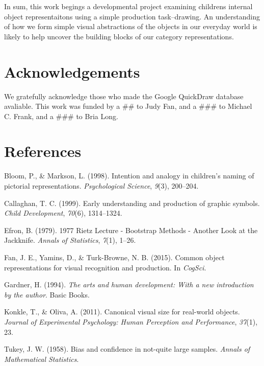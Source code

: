 \documentclass[10pt, letterpaper]{article}
\begin{document}
In sum, this work begings a developmental project examining childrens
internal object representaitons using a simple production task--drawing.
An understanding of how we form simple visual abstractions of the
objects in our everyday world is likely to help uncover the building
blocks of our category representations.

\section{Acknowledgements}\label{acknowledgements}

We gratefully acknowledge those who made the Google QuickDraw database
avaliable. This work was funded by a \#\# to Judy Fan, and a \#\#\# to
Michael C. Frank, and a \#\#\# to Bria Long.

\section{References}\label{references}

\setlength{\parindent}{-0.1in} \setlength{\leftskip}{0.125in} \noindent

\hypertarget{refs}{}
\hypertarget{ref-bloom1998intention}{}
Bloom, P., \& Markson, L. (1998). Intention and analogy in children's
naming of pictorial representations. \emph{Psychological Science},
\emph{9}(3), 200--204.

\hypertarget{ref-callaghan1999early}{}
Callaghan, T. C. (1999). Early understanding and production of graphic
symbols. \emph{Child Development}, \emph{70}(6), 1314--1324.

\hypertarget{ref-Efron:1979ts}{}
Efron, B. (1979). 1977 Rietz Lecture - Bootstrap Methods - Another Look
at the Jackknife. \emph{Annals of Statistics}, \emph{7}(1), 1--26.

\hypertarget{ref-fan2015common}{}
Fan, J. E., Yamins, D., \& Turk-Browne, N. B. (2015). Common object
representations for visual recognition and production. In \emph{CogSci}.

\hypertarget{ref-gardner1994arts}{}
Gardner, H. (1994). \emph{The arts and human development: With a new
introduction by the author}. Basic Books.

\hypertarget{ref-konkle2011canonical}{}
Konkle, T., \& Oliva, A. (2011). Canonical visual size for real-world
objects. \emph{Journal of Experimental Psychology: Human Perception and
Performance}, \emph{37}(1), 23.

\hypertarget{ref-Tukey:1958wn}{}
Tukey, J. W. (1958). Bias and confidence in not-quite large samples.
\emph{Annals of Mathematical Statistics}.
\end{document}
